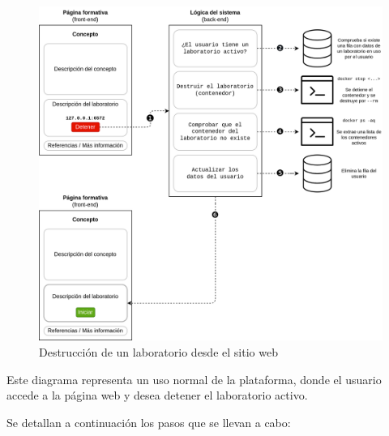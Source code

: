             \begin{figure}
                \centering

                \includegraphics[scale=0.125]{images/Diagramas/detener.png}
                \caption{Destrucción de un laboratorio desde el sitio web}
                    \label{fig:detener-laboratorio}
            \end{figure}

            Este diagrama representa un uso normal de la plataforma, donde el usuario accede a la página web y desea detener el laboratorio activo.

            Se detallan a continuación los pasos que se llevan a cabo:

